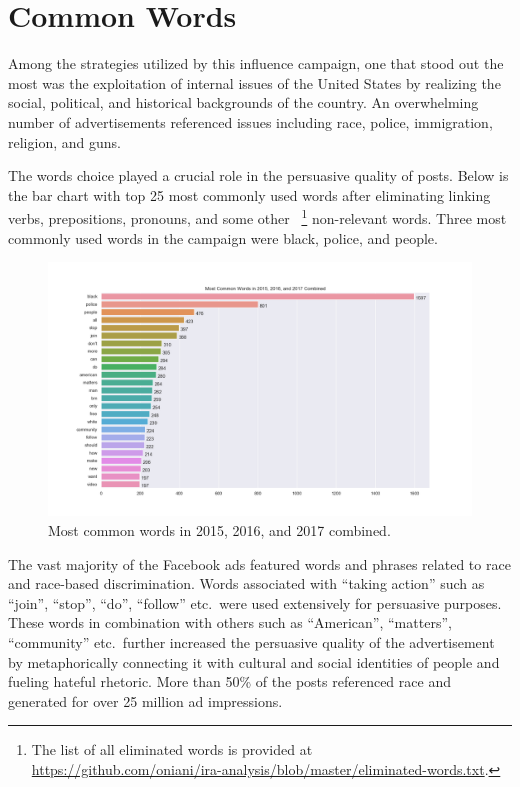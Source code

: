 \documentclass[12pt]{article}
\theoremstyle{definition}
\begin{document}

\section*{\centering Common Words}

Among the strategies utilized by this influence campaign, one that stood out
the most was the exploitation of internal issues of the United States by
realizing the social, political, and historical backgrounds of the country.
An overwhelming number of advertisements referenced issues including race,
police, immigration, religion, and guns.

\bigskip

The words choice played a crucial role in the persuasive quality of posts.
Below is the bar chart with top 25 most commonly used words after eliminating
linking verbs, prepositions, pronouns, and some other
~\footnote{The list of all eliminated words is provided at\\
\url{https://github.com/oniani/ira-analysis/blob/master/eliminated-words.txt}.}
non-relevant words. Three most commonly used words in the campaign were black,
police, and people.

\begin{figure}[H]
\centering
\includegraphics[width=\columnwidth]{./image/barchart-plots/barchart_word_counts.png}
\caption{Most common words in 2015, 2016, and 2017 combined.}
\end{figure}

The vast majority of the Facebook ads featured words and phrases related to
race and race-based discrimination. Words associated with ``taking action''
such as ``join'', ``stop'', ``do'', ``follow'' etc.~were used extensively for
persuasive purposes. These words in combination with others such  as ``American'',
``matters'', ``community'' etc.~further increased the persuasive quality of the
advertisement by metaphorically connecting it with cultural and social identities
of people and fueling hateful rhetoric. More than 50\% of the posts referenced
race and generated for over 25 million ad impressions.
\end{document}
